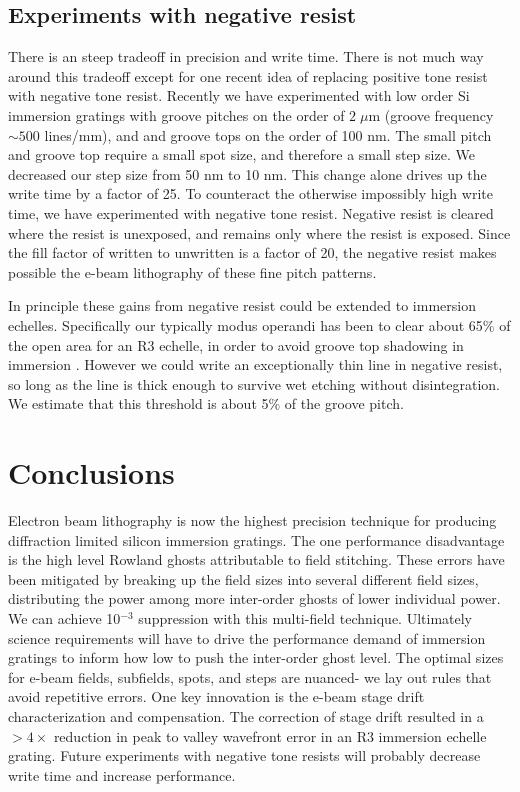 \subsection{Experiments with negative resist}
There is an steep tradeoff in precision and write time.  There is not much way around this tradeoff except for one recent idea of replacing positive tone resist with negative tone resist.  Recently we have experimented with low order Si immersion gratings with groove pitches on the order of $2 \; \mu$m (groove frequency $\sim500$ lines/mm), and and groove tops on the order of 100 nm.   The small pitch and groove top require a small spot size, and therefore a small step size.  We decreased our step size from 50 nm to 10 nm.  This change alone drives up the write time by a factor of 25.  To counteract the otherwise impossibly high write time, we have experimented with negative tone resist.  Negative resist is cleared where the resist is unexposed, and remains only where the resist is exposed.  Since the fill factor of written to unwritten is a factor of 20, the negative resist makes possible the e-beam lithography of these fine pitch patterns.  

In principle these gains from negative resist could be extended to immersion echelles.  Specifically our typically modus operandi has been to clear about 65\% of the open area for an R3 echelle, in order to avoid groove top shadowing in immersion \cite{2012SPIE.8450E..2SG}.  However we could write an exceptionally thin line in negative resist, so long as the line is thick enough to survive wet etching without disintegration.  We estimate that this threshold is about 5\% of the groove pitch.  


\section{Conclusions}
Electron beam lithography is now the highest precision technique for producing diffraction limited silicon immersion gratings.  The one performance disadvantage is the high level Rowland ghosts attributable to field stitching.  These errors have been mitigated by breaking up the field sizes into several different field sizes, distributing the power among more inter-order ghosts of lower individual power.  We can achieve 10$^{-3}$ suppression with this multi-field technique.  Ultimately science requirements will have to drive the performance demand of immersion gratings to inform how low to push the inter-order ghost level.  The optimal sizes for e-beam fields, subfields, spots, and steps are nuanced- we lay out rules that avoid repetitive errors.  One key innovation is the e-beam stage drift characterization and compensation.  The correction of stage drift resulted in a $>4\times$ reduction in peak to valley wavefront error in an R3 immersion echelle grating.  Future experiments with negative tone resists will probably decrease write time and increase performance.

